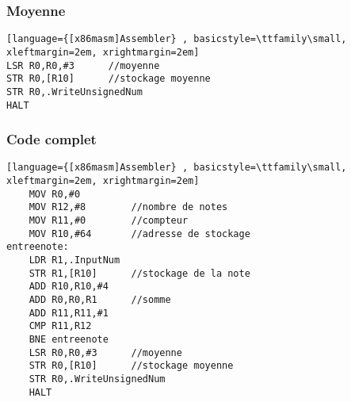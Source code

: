 \documentclass[svgnames,11pt]{beamer}
\begin{document}
\begin{frame}[fragile]
    \frametitle{Moyenne}

\begin{center}
\begin{lstlisting}[language={[x86masm]Assembler} , basicstyle=\ttfamily\small, xleftmargin=2em, xrightmargin=2em]
LSR R0,R0,#3      //moyenne
STR R0,[R10]      //stockage moyenne
STR R0,.WriteUnsignedNum
HALT
\end{lstlisting}
\end{center}
\end{frame}
\begin{frame}[fragile]
    \frametitle{Code complet}

\begin{center}
\begin{lstlisting}[language={[x86masm]Assembler} , basicstyle=\ttfamily\small, xleftmargin=2em, xrightmargin=2em]
    MOV R0,#0
    MOV R12,#8        //nombre de notes
    MOV R11,#0        //compteur
    MOV R10,#64       //adresse de stockage
entreenote:
    LDR R1,.InputNum
    STR R1,[R10]      //stockage de la note
    ADD R10,R10,#4
    ADD R0,R0,R1      //somme
    ADD R11,R11,#1
    CMP R11,R12
    BNE entreenote
    LSR R0,R0,#3      //moyenne
    STR R0,[R10]      //stockage moyenne
    STR R0,.WriteUnsignedNum
    HALT
\end{lstlisting}
\end{center}
\end{frame}
\end{document}

